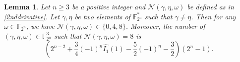 \documentclass{article}
\newcommand{\F}{\mathbb{F}}
\newcommand{\0}{\textbf{0}}
\newcommand{\1}{\textbf{1}}
\theoremstyle{plain}
\newtheorem{lemma}{Lemma}
\theoremstyle{nonumberplain}
\begin{document}
\begin{lemma}\cite{tang2022invfunc}\label{Secondderivativesolution}
Let $n\geq 3$ be a positive integer and $\mathcal{N}(\gamma,\eta,\omega)$ be defined as in \eqref{2nddrivative}.
Let $\gamma,\eta$ be two elements of $\F_{2^n}^*$ such that $\gamma\neq \eta$. Then for any $\omega\in\F_{2^n}$,  we have $\mathcal{N}(\gamma,\eta,\omega)\in \{0,4,8\}$.
Moreover, the number of $(\gamma,\eta,\omega)\in\F_{2^n}^3$ such that $\mathcal{N}(\gamma,\eta,\omega)=8$ is
$$\left(2^{n-2}+\frac{3}{4}(-1)^{n}\widehat{I_1}(1)-\frac{5}{2}(-1)^{n}-\frac{3}{2}\right)\left(2^n-1\right).$$
\end{lemma}


        
        
\end{document}

